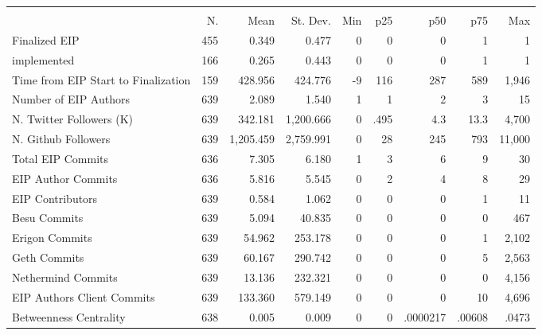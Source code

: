 {
\def\sym#1{\ifmmode^{#1}\else\(^{#1}\)\fi}
\begin{tabular}{l*{1}{rrrrrrrr}}
\hline\hline
                    &\multicolumn{8}{c}{}                                                                                   \\
                    &          N.&        Mean&    St. Dev.&         Min&         p25&         p50&         p75&         Max\\
\hline
Finalized EIP       &         455&       0.349&       0.477&           0&           0&           0&           1&           1\\
implemented         &         166&       0.265&       0.443&           0&           0&           0&           1&           1\\
Time from EIP Start to Finalization&         159&     428.956&     424.776&          -9&         116&         287&         589&       1,946\\
Number of EIP Authors&         639&       2.089&       1.540&           1&           1&           2&           3&          15\\
N. Twitter Followers (K)&         639&     342.181&   1,200.666&           0&        .495&         4.3&        13.3&       4,700\\
N. Github Followers &         639&   1,205.459&   2,759.991&           0&          28&         245&         793&      11,000\\
Total EIP Commits   &         636&       7.305&       6.180&           1&           3&           6&           9&          30\\
EIP Author Commits  &         636&       5.816&       5.545&           0&           2&           4&           8&          29\\
EIP Contributors    &         639&       0.584&       1.062&           0&           0&           0&           1&          11\\
Besu Commits        &         639&       5.094&      40.835&           0&           0&           0&           0&         467\\
Erigon Commits      &         639&      54.962&     253.178&           0&           0&           0&           1&       2,102\\
Geth Commits        &         639&      60.167&     290.742&           0&           0&           0&           5&       2,563\\
Nethermind Commits  &         639&      13.136&     232.321&           0&           0&           0&           0&       4,156\\
EIP Authors Client Commits&         639&     133.360&     579.149&           0&           0&           0&          10&       4,696\\
Betweenness Centrality&         638&       0.005&       0.009&           0&           0&    .0000217&      .00608&       .0473\\
\hline\hline
\end{tabular}
}
